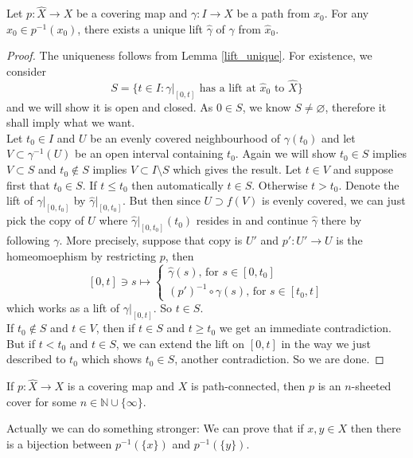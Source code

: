 \begin{lemma}\label{path_lift}
    Let $p:\hat{X}\to X$ be a covering map and $\gamma:I\to X$ be a path from $x_0$.
    For any $\hat{x}_0\in p^{-1}(x_0)$, there exists a unique lift $\hat{\gamma}$ of $\gamma$ from $\hat{x}_0$.
\end{lemma}
\begin{proof}
    The uniqueness follows from Lemma \ref{lift_unique}.
    For existence, we consider
    $$S=\{t\in I:\gamma|_{[0,t]}\text{ has a lift at $\hat{x}_0$ to $\hat{X}$}\}$$
    and we will show it is open and closed.
    As $0\in S$, we know $S\neq\varnothing$, therefore it shall imply what we want.\\
    Let $t_0\in I$ and $U$ be an evenly covered neighbourhood of $\gamma(t_0)$ and let $V\subset\gamma^{-1}(U)$ be an open interval containing $t_0$.
    Again we will show $t_0\in S$ implies $V\subset S$ and $t_0\notin S$ implies $V\subset I\setminus S$ which gives the result.
    Let $t\in V$ and suppose first that $t_0\in S$.
    If $t\le t_0$ then automatically $t\in S$.
    Otherwise $t>t_0$.
    Denote the lift of $\gamma|_{[0,t_0]}$ by $\hat{\gamma}|_{[0,t_0]}$.
    But then since $U\supset f(V)$ is evenly covered, we can just pick the copy of $U$ where $\hat{\gamma}|_{[0,t_0]}(t_0)$ resides in and continue $\hat{\gamma}$ there by following $\gamma$.
    More precisely, suppose that copy is $U'$ and $p':U'\to U$ is the homeomoephism by restricting $p$, then
    $$[0,t]\ni s\mapsto\begin{cases}
        \hat\gamma(s)\text{, for $s\in[0,t_0]$}\\
        (p')^{-1}\circ\gamma(s)\text{, for $s\in[t_0,t]$}
    \end{cases}$$
    which works as a lift of $\gamma|_{[0,t]}$.
    So $t\in S$.\\
    If $t_0\notin S$ and $t\in V$, then if $t\in S$ and $t\ge t_0$ we get an immediate contradiction.
    But if $t<t_0$ and $t\in S$, we can extend the lift on $[0,t]$ in the way we just described to $t_0$ which shows $t_0\in S$, another contradiction.
    So we are done.
\end{proof}
\begin{lemma}
    If $p:\hat{X}\to X$ is a covering map and $X$ is path-connected, then $p$ is an $n$-sheeted cover for some $n\in\mathbb N\cup\{\infty\}$.
\end{lemma}
Actually we can do something stronger:
We can prove that if $x,y\in X$ then there is a bijection between $p^{-1}(\{x\})$ and $p^{-1}(\{y\})$.
